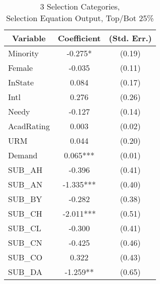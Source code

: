 \begin{table}[H]\centering
  \begin{threeparttable}
    \caption{3 Selection Categories, \\Selection Equation Output, Top/Bot 25\%}\label{table:b4}
    \begin{tabular}{l c c}
      \hline\hline 
      \multicolumn{1}{c}{\textbf{Variable}} & {\textbf{Coefficient}} & \textbf{(Std. Err.)} \\ 
      \hline
      \hline 
      Minority                              & -0.275*                & (0.19)               \\
      Female                                & -0.035                 & (0.11)               \\
      InState                                    & 0.084                  & (0.17)               \\
      Intl                                  & 0.276                  & (0.26)               \\
      Needy                                 & -0.127                 & (0.14)               \\
      AcadRating                            & 0.003                  & (0.02)               \\
      URM                                   & 0.044                  & (0.20)               \\
      Demand                                & 0.065***               & (0.01)               \\
      SUB\_AH                               & -0.396                 & (0.41)               \\
      SUB\_AN                               & -1.335***              & (0.40)               \\
      SUB\_BY                               & -0.282                 & (0.38)               \\
      SUB\_CH                               & -2.011***              & (0.51)               \\
      SUB\_CL                               & -0.300                 & (0.41)               \\
      SUB\_CN                               & -0.425                 & (0.46)               \\
      SUB\_CO                               & 0.322                  & (0.43)               \\
      SUB\_DA                               & -1.259**               & (0.65)               \\

\end{tabular}
\end{threeparttable}
\end{table}

